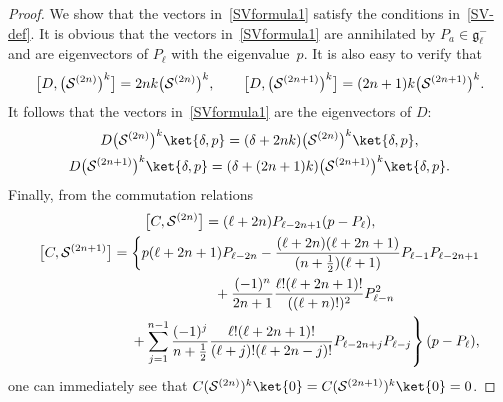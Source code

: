 \documentclass[pdftex]{sigma}
\numberwithin{equation}{section}
\begin{document}
\begin{proof}
We show that the vectors in~\eqref{SVformula1} satisfy the conditions in~\eqref{SV-def}.
It is obvious that the vectors in~\eqref{SVformula1} are annihilated by $ P_a \in {\mathfrak g}_{\ell}^- $ and are
eigenvectors of $P_{\ell}$ with the eigenvalue~$p$.
It is also easy to verify that
\begin{gather*}
\big[D, \big({\cal S}^{(2n)}\big)^k \big] = 2nk \big({\cal S}^{(2n)}\big)^k,
\qquad
\big[D, \big({\cal S}^{(2n+1)}\big)^k \big] = (2n+1)k \big({\cal S}^{(2n+1)}\big)^k.
\end{gather*}
It follows that the vectors in~\eqref{SVformula1} are the eigenvectors of $D$:
\begin{gather*}
D \big({\cal S}^{(2n)}\big)^k \ket{\delta,p} = (\delta + 2nk) \big({\cal S}^{(2n)}\big)^k \ket{\delta,p},
\\
D \big({\cal S}^{(2n+1)}\big)^k \ket{\delta,p} = (\delta + (2n+1)k) \big({\cal S}^{(2n+1)}\big)^k \ket{\delta,p}.
\end{gather*}
Finally, from the commutation relations
\begin{gather*}
\big[C, {\cal S}^{(2n)}\big]  =  (\ell+2n) P_{\ell-2n+1} (p - P_{\ell} ),
\\ \big[C, {\cal S}^{(2n+1)}\big]  =  \left\{p(\ell +2n+1) P_{\ell-2n} - \frac{(\ell+2n)(\ell+2n+1)}{(n+\frac{1}{2})
(\ell+1)} P_{\ell-1} P_{\ell-2n+1} \right.
\\
\hphantom{\big[C, {\cal S}^{(2n+1)}\big]  = }{}
  +  \frac{(-1)^n}{2n+1}  \frac{\ell! (\ell+2n+1)!}{((\ell+n)!)^2}  P_{\ell-n}^2
\\
\left. \hphantom{\big[C, {\cal S}^{(2n+1)}\big]  = }{} +
\sum\limits_{j=1}^{n-1} \frac{(-1)^j}{n+\frac{1}{2}}  \frac{\ell!  (\ell+2n+1)!}{(\ell+j)!  (\ell+2n-j)!}
P_{\ell-2n+j}  P_{\ell-j} \right\} (p - P_{\ell} ),
\end{gather*}
one can immediately see that $ C ({\cal S}^{(2n)})^k \ket{0} = C ({\cal S}^{(2n+1)})^k \ket{0}=0$.
\end{proof}
\end{document}
